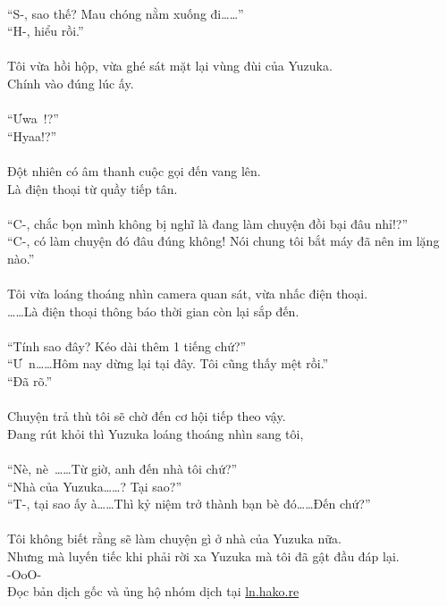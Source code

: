 \documentclass[12pt,a4paper, twosides]{book}
\begin{document}
\\
“S-, sao thế? Mau chóng nằm xuống đi……”\\
“H-, hiểu rồi.”\\
\\
Tôi vừa hồi hộp, vừa ghé sát mặt lại vùng đùi của Yuzuka.\\
Chính vào đúng lúc ấy.\\
\\
“Ưwa~!?”\\
“Hyaa!?”\\
\\
Đột nhiên có âm thanh cuộc gọi đến vang lên.\\
Là điện thoại từ quầy tiếp tân.\\
\\
“C-, chắc bọn mình không bị nghĩ là đang làm chuyện đồi bại đâu nhỉ!?”\\
“C-, có làm chuyện đó đâu đúng không! Nói chung tôi bắt máy đã nên im lặng nào.”\\
\\
Tôi vừa loáng thoáng nhìn camera quan sát, vừa nhấc điện thoại.\\
……Là điện thoại thông báo thời gian còn lại sắp đến.\\
\\
“Tính sao đây? Kéo dài thêm 1 tiếng chứ?”\\
“Ư~n……Hôm nay dừng lại tại đây. Tôi cũng thấy mệt rồi.”\\
“Đã rõ.”\\
\\
Chuyện trả thù tôi sẽ chờ đến cơ hội tiếp theo vậy.\\
Đang rút khỏi thì Yuzuka loáng thoáng nhìn sang tôi,\\
\\
“Nè, nè~……Từ giờ, anh đến nhà tôi chứ?”\\
“Nhà của Yuzuka……? Tại sao?”\\
“T-, tại sao ấy à……Thì kỷ niệm trở thành bạn bè đó……Đến chứ?”\\
\\
Tôi không biết rằng sẽ làm chuyện gì ở nhà của Yuzuka nữa.\\
Nhưng mà luyến tiếc khi phải rời xa Yuzuka mà tôi đã gật đầu đáp lại.\\
-OoO-\\
Đọc bản dịch gốc và ủng hộ nhóm dịch tại \href{https://ln.hako.re/}{ln.hako.re}\\
\newpage
\end{document}
